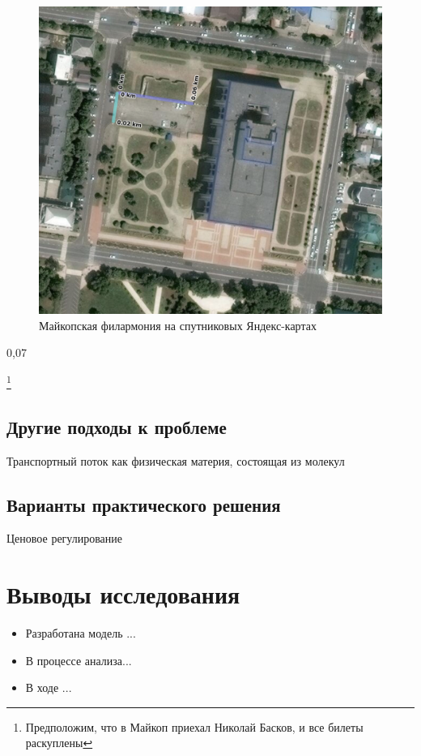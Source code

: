 \begin{figure}
	\includegraphics[scale=0.6]{img/filarmony_parking}
	\caption{Майкопская филармония на спутниковых Яндекс-картах}
\end{figure}

0,07


\footnote{Предположим, что в Майкоп приехал Николай Басков, и все билеты раскуплены}



\section{Другие подходы к проблеме}
Транспортный поток как физическая материя, состоящая из молекул \cite[168]{lukanin}
\section{Варианты практического решения}
Ценовое регулирование




\chapter{Выводы исследования}

\begin{itemize}
	\item Разработана модель ...
	\item В процессе анализа...
	\item В ходе ...
\end{itemize}

